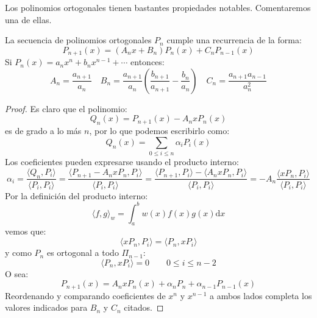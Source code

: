   Los polinomios ortogonales tienen bastantes propiedades notables.
  Comentaremos una de ellas.
  \begin{theorem}
    \label{theo:triple-recursion-relation}
    La secuencia de polinomios ortogonales \(P_n\)
    cumple una recurrencia de la forma:
    \begin{equation}
      \label{eq:triple-recursion-relation}
      P_{n + 1}(x)
        = (A_n x + B_n) P_n(x) + C_n P_{n - 1}(x)
    \end{equation}
    Si \(P_n(x) = a_n x^n + b_n x^{n - 1} + \dotsb\)
    entonces:
    \begin{equation}
      \label{eq:triple-recursion-relation-coefs}
      A_n
        = \frac{a_{n + 1}}{a_n}
        \quad
      B_n
        = \frac{a_{n + 1}}{a_n}
            \left( \frac{b_{n + 1}}{a_{n + 1}} - \frac{b_n}{a_n} \right)
        \quad
      C_n
        = \frac{a_{n + 1} a_{n - 1}}{a_n^2}
    \end{equation}
  \end{theorem}
  \begin{proof}
    Es claro que el polinomio:
    \begin{equation*}
      Q_n(x)
        = P_{n + 1}(x) - A_n x P_n(x)
    \end{equation*}
    es de grado a lo más \(n\),
    por lo que podemos escribirlo como:
    \begin{equation*}
      Q_n(x)
        = \sum_{0 \le i \le n} \alpha_i P_i(x)
    \end{equation*}
    Los coeficientes pueden expresarse usando el producto interno:
    \begin{equation*}
      \alpha_i
        = \frac{\langle Q_n, P_i \rangle}{\langle P_i, P_i \rangle}
        = \frac{\langle P_{n + 1} - A_n x P_n, P_i \rangle}
               {\langle P_i, P_i \rangle}
        = \frac{\langle P_{n + 1}, P_i \rangle
                  - \langle A_n x P_n, P_i \rangle}
               {\langle P_i, P_i \rangle}
        = - A_n \frac{\langle x P_n, P_i \rangle}
                     {\langle P_i, P_i \rangle}
    \end{equation*}
    Por la definición del producto interno:
    \begin{equation*}
      \langle f, g \rangle_w
        = \int_a^b w(x) f(x) g(x) \mathrm{d} x
    \end{equation*}
    vemos que:
    \begin{equation*}
      \langle x P_n, P_i \rangle
        = \langle P_n, x P_i \rangle
    \end{equation*}
    y como \(P_n\) es ortogonal a todo \(\Pi_{n - 1}\):
    \begin{equation*}
      \langle P_n, x P_i \rangle
        = 0
        \qquad 0 \le i \le n - 2
    \end{equation*}
    O sea:
    \begin{equation*}
      P_{n + 1}(x)
        = A_n x P_n(x) + \alpha_n P_n + \alpha_{n - 1} P_{n - 1}(x)
    \end{equation*}
    Reordenando
    y comparando coeficientes de \(x^n\) y \(x^{n - 1}\) a ambos lados
    completa los valores indicados para \(B_n\) y \(C_n\) citados.
  \end{proof}

